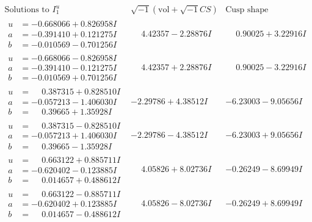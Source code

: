 \documentclass[1p]{elsarticle_modified}
\theoremstyle{definition}
\newcommand{\I}{\sqrt{-1}}
\begin{document}
$$\begin{array}{c|c|c}  
\text{Solutions to }I^u_{1}& \I (\text{vol} + \sqrt{-1}CS) & \text{Cusp shape}\\
 \hline 
\begin{aligned}
u &= -0.668066 + 0.826958 I \\
a &= -0.391410 + 0.121275 I \\
b &= -0.010569 - 0.701256 I\end{aligned}
 & \phantom{-}4.42357 - 2.28876 I & \phantom{-}0.90025 + 3.22916 I \\ \hline\begin{aligned}
u &= -0.668066 - 0.826958 I \\
a &= -0.391410 - 0.121275 I \\
b &= -0.010569 + 0.701256 I\end{aligned}
 & \phantom{-}4.42357 + 2.28876 I & \phantom{-}0.90025 - 3.22916 I \\ \hline\begin{aligned}
u &= \phantom{-}0.387315 + 0.828510 I \\
a &= -0.057213 - 1.406030 I \\
b &= \phantom{-}0.39665 + 1.35928 I\end{aligned}
 & -2.29786 + 4.38512 I & -6.23003 - 9.05656 I \\ \hline\begin{aligned}
u &= \phantom{-}0.387315 - 0.828510 I \\
a &= -0.057213 + 1.406030 I \\
b &= \phantom{-}0.39665 - 1.35928 I\end{aligned}
 & -2.29786 - 4.38512 I & -6.23003 + 9.05656 I \\ \hline\begin{aligned}
u &= \phantom{-}0.663122 + 0.885711 I \\
a &= -0.620402 - 0.123885 I \\
b &= \phantom{-}0.014657 + 0.488612 I\end{aligned}
 & \phantom{-}4.05826 + 8.02736 I & -0.26249 - 8.69949 I \\ \hline\begin{aligned}
u &= \phantom{-}0.663122 - 0.885711 I \\
a &= -0.620402 + 0.123885 I \\
b &= \phantom{-}0.014657 - 0.488612 I\end{aligned}
 & \phantom{-}4.05826 - 8.02736 I & -0.26249 + 8.69949 I \\ \hline\begin{aligned}

\end{aligned}
\end{array}$$
\end{document}

